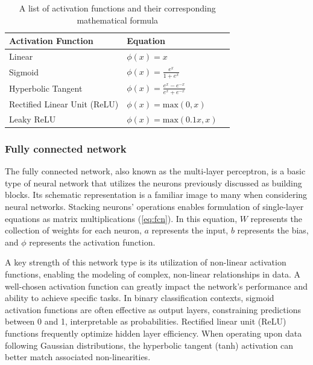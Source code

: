 \begin{table}[H]
    \caption{A list of activation functions and their corresponding mathematical formula} \label{tab:activation-functions}
    \begin{tabularx}{\columnwidth}{|X|X|X|}
        \hline
        {\bf Activation Function} & {\bf Equation} \\ \hline 
        Linear & $\phi(x) = x$ \\\hline
        Sigmoid & $\phi(x) = \frac{e^{x}}{1 + e^{x}}$\\ \hline 
        Hyperbolic Tangent & $\phi(x) = \frac{e^x - e^{-x}}{e^{x} + e^{-x}}$\\ \hline 
        Rectified Linear Unit (ReLU) & $\phi(x) = \text{max}(0,x)$\\ \hline 
        Leaky ReLU & $\phi(x) = \text{max}(0.1x,x)$ \\ \hline 
    \end{tabularx}
\end{table}

\subsubsection{Fully connected network}
The fully connected network, also known as the multi-layer perceptron, is a basic type of neural network that utilizes the neurons previously discussed as building blocks.
Its schematic representation is a familiar image to many when considering neural networks.
Stacking neurons' operations enables formulation of single-layer equations as matrix multiplications (\cref{eq:fcn}).
In this equation, $W$ represents the collection of weights for each neuron, $a$ represents the input, $b$ represents the bias, and $\phi$ represents the activation function.

A key strength of this network type is its utilization of non-linear activation functions, enabling the modeling of complex, non-linear relationships in data.
A well-chosen activation function can greatly impact the network's performance and ability to achieve specific tasks.
In binary classification contexts, sigmoid activation functions are often effective as output layers, constraining predictions between 0 and 1, interpretable as probabilities.
Rectified linear unit (ReLU) functions frequently optimize hidden layer efficiency.
When operating upon data following Gaussian distributions, the hyperbolic tangent (tanh) activation can better match associated non-linearities.

